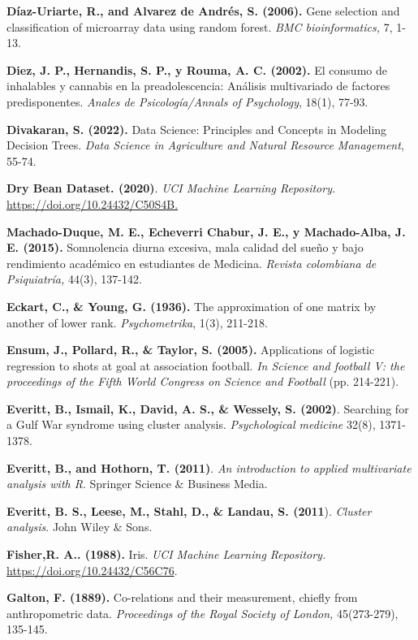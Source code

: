 \begin{thebibliography}{99}
\textbf{Díaz-Uriarte, R., and Alvarez de Andrés, S. (2006).} Gene selection and classification of microarray data using random forest. \emph{BMC bioinformatics,} 7, 1-13.

\textbf{Diez, J. P., Hernandis, S. P., y Rouma, A. C. (2002).} El consumo de inhalables y cannabis en la preadolescencia: Análisis multivariado de factores predisponentes. \emph{Anales de Psicología/Annals of Psychology}, 18(1), 77-93.

\textbf{Divakaran, S. (2022). }Data Science: Principles and Concepts in Modeling Decision Trees.\emph{ Data Science in Agriculture and Natural Resource Management}, 55-74.

 \textbf{Dry Bean Dataset. (2020)}.\emph{ UCI Machine Learning Repository. } \url{https://doi.org/10.24432/C50S4B.}

 \textbf{Machado-Duque, M. E., Echeverri Chabur, J. E., y Machado-Alba, J. E. (2015).} Somnolencia diurna excesiva, mala calidad del sueño y bajo rendimiento académico en estudiantes de Medicina. \emph{Revista colombiana de Psiquiatría,} 44(3), 137-142.


\textbf{Eckart, C., \& Young, G. (1936).} The approximation of one matrix by another of lower rank. \emph{Psychometrika}, 1(3), 211-218.

\textbf{Ensum, J., Pollard, R., \& Taylor, S. (2005).} Applications of logistic regression to shots at goal at association football. \emph{In Science and football V: the proceedings of the Fifth World Congress on Science and Football} (pp. 214-221).

 \textbf{Everitt, B., Ismail, K., David, A. S., \& Wessely, S. (2002)}. Searching for a Gulf War syndrome using cluster analysis. \emph{Psychological medicine} 32(8), 1371-1378.

\textbf{Everitt, B., and Hothorn, T. (2011)}. \emph{An introduction to applied multivariate analysis with R}. Springer Science \& Business Media.

\textbf{Everitt, B. S., Leese, M., Stahl, D., \& Landau, S. (2011}). \emph{Cluster analysis}. John Wiley \& Sons.

 \textbf{Fisher,R. A.. (1988).} Iris. \emph{UCI Machine Learning Repository. }\url{https://doi.org/10.24432/C56C76}. 

 \textbf{Galton, F. (1889).} Co-relations and their measurement, chiefly from anthropometric data.\emph{ Proceedings of the Royal Society of London,} 45(273-279), 135-145.


\end{thebibliography}
